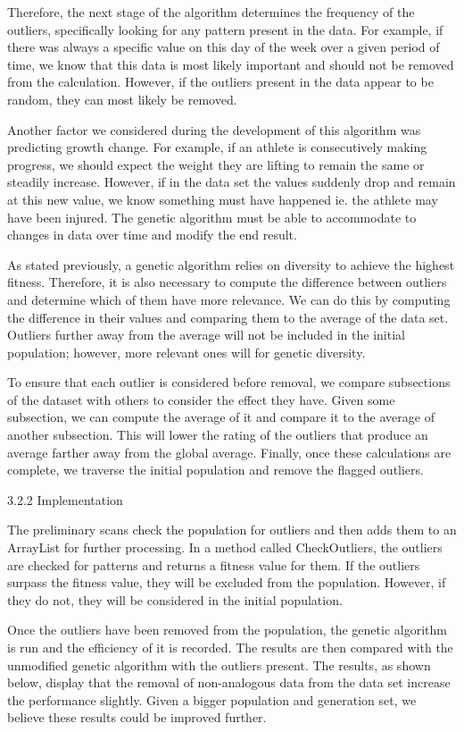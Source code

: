 \documentclass[conference]{IEEEtran}
\begin{document}
Therefore, the next stage of the algorithm determines the frequency of the outliers, specifically looking for any pattern present in the data. For example, if there was always a specific value on this day of the week over a given period of time, we know that this data is most likely important and should not be removed from the calculation. However, if the outliers present in the data appear to be random, they can most likely be removed. 

Another factor we considered during the development of this algorithm was predicting growth change. For example, if an athlete is consecutively making progress, we should expect the weight they are lifting to remain the same or steadily increase. However, if in the data set the values suddenly drop and remain at this new value, we know something must have happened ie. the athlete may have been injured. The genetic algorithm must be able to accommodate to changes in data over time and modify the end result.

As stated previously, a genetic algorithm relies on diversity to achieve the highest fitness. Therefore, it is also necessary to compute the difference between outliers and determine which of them have more relevance. We can do this by computing the difference in their values and comparing them to the average of the data set. Outliers further away from the average will not be included in the initial population; however, more relevant ones will for genetic diversity. 

To ensure that each outlier is considered before removal, we compare subsections of the dataset with others to consider the effect they have. Given some subsection, we can compute the average of it and compare it to the average of another subsection. This will lower the rating of the outliers that produce an average farther away from the global average. Finally, once these calculations are complete, we traverse the initial population and remove the flagged outliers.

3.2.2 Implementation

The preliminary scans check the population for outliers and then adds them to an ArrayList for further processing. In a method called CheckOutliers, the outliers are checked for patterns and returns a fitness value for them. If the outliers surpass the fitness value, they will be excluded from the population. However, if they do not, they will be considered in the initial population.

Once the outliers have been removed from the population, the genetic algorithm is run and the efficiency of it is recorded. The results are then compared with the unmodified genetic algorithm with the outliers present. The results, as shown below, display that the removal of non-analogous data from the data set increase the performance slightly. Given a bigger population and generation set, we believe these results could be improved further. 
\end{document}
